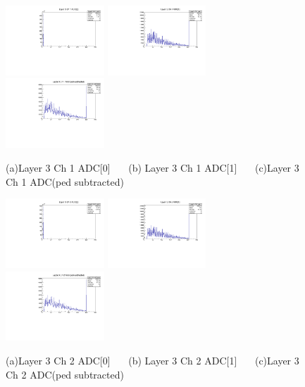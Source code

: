 \documentclass[a4paper,11pt]{article}
\theoremstyle{mytheor}
\begin{document}
\begin{figure}[H] 
\vspace*{-0.3cm} 
\includegraphics[width=0.33\textwidth,scale=0.5,trim=0 0 0 0,clip]{plotsdir/file0_test-Layer3_Ch1_adc0-1.pdf} 
\includegraphics[width=0.33\textwidth,scale=0.5,trim=0 0 0 0,clip]{plotsdir/file0_test-Layer3_Ch1_adc1-1.pdf} 
\includegraphics[width=0.33\textwidth,scale=0.5,trim=0 0 0 0,clip]{plotsdir/file0_test-Layer3_Ch1_adcPedsub-1.pdf} 
\caption{(a)Layer 3 Ch 1 ADC[0] ~~~(b) Layer 3 Ch 1 ADC[1] ~~~(c)Layer 3 Ch 1 ADC(ped subtracted) } 
\end{figure} 
\begin{figure}[H] 
\vspace*{-0.3cm} 
\includegraphics[width=0.33\textwidth,scale=0.5,trim=0 0 0 0,clip]{plotsdir/file0_test-Layer3_Ch2_adc0-1.pdf} 
\includegraphics[width=0.33\textwidth,scale=0.5,trim=0 0 0 0,clip]{plotsdir/file0_test-Layer3_Ch2_adc1-1.pdf} 
\includegraphics[width=0.33\textwidth,scale=0.5,trim=0 0 0 0,clip]{plotsdir/file0_test-Layer3_Ch2_adcPedsub-1.pdf} 
\caption{(a)Layer 3 Ch 2 ADC[0] ~~~(b) Layer 3 Ch 2 ADC[1] ~~~(c)Layer 3 Ch 2 ADC(ped subtracted) } 
\end{figure} 
\end{document}
